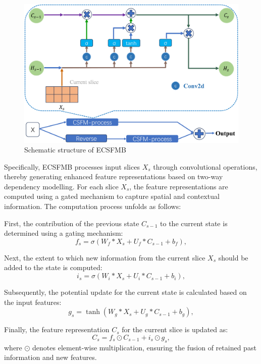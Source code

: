 \documentclass[AMA,Times1COL]{WileyNJDv5} %
\begin{document}
\begin{figure}[htbp]
\centerline{\includegraphics[width=0.75\linewidth]{Fig/fig2.png}}
\caption{Schematic structure of ECSFMB}
\label{fig:2}
\end{figure}

Specifically, ECSFMB processes input slices $X_s$ through convolutional operations, thereby generating enhanced feature representations based on two-way dependency modelling. For each slice \( X_s \), the feature representations are computed using a gated mechanism to capture spatial and contextual information. The computation process unfolds as follows:

First, the contribution of the previous state \( C_{s-1} \) to the current state is determined using a gating mechanism:
\begin{equation}
    f_s = \sigma(W_f \ast X_s + U_f \ast C_{s-1} + b_f),
\end{equation}

Next, the extent to which new information from the current slice \( X_s \) should be added to the state is computed:
\begin{equation}
    i_s = \sigma(W_i \ast X_s + U_i \ast C_{s-1} + b_i),
\end{equation}

Subsequently, the potential update for the current state is calculated based on the input features:
\begin{equation}
    g_s = \tanh(W_g \ast X_s + U_g \ast C_{s-1} + b_g),
\end{equation}

Finally, the feature representation \( C_s \) for the current slice is updated as:
\begin{equation}
    C_s = f_s \odot C_{s-1} + i_s \odot g_s,
\end{equation}
where \( \odot \) denotes element-wise multiplication, ensuring the fusion of retained past information and new features.
\end{document}
